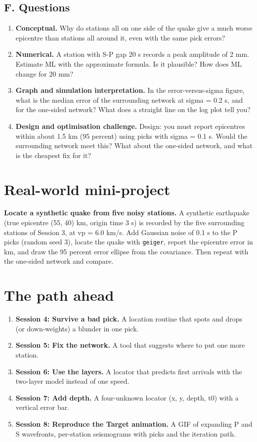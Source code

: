 \documentclass[11pt,a4paper]{article}
\begin{document}
\subsection*{F. Questions}
\begin{enumerate}[nosep]
\item \textbf{Conceptual.} Why do stations all on one side of the quake give a much worse epicentre than stations all around it, even with the same pick errors?
\item \textbf{Numerical.} A station with S-P gap 20 s records a peak amplitude of 2 mm. Estimate ML with the approximate formula. Is it plausible? How does ML change for 20 mm?
\item \textbf{Graph and simulation interpretation.} In the error-versus-sigma figure, what is the median error of the surrounding network at sigma = 0.2 s, and for the one-sided network? What does a straight line on the log plot tell you?
\item \textbf{Design and optimisation challenge.} Design: you must report epicentres within about 1.5 km (95 percent) using picks with sigma = 0.1 s. Would the surrounding network meet this? What about the one-sided network, and what is the cheapest fix for it?
\end{enumerate}

\section{Real-world mini-project}
\textbf{Locate a synthetic quake from five noisy stations.} A synthetic earthquake (true epicentre (55, 40) km, origin time 3 s) is recorded by the five surrounding stations of Session 3, at vp = 6.0 km/s. Add Gaussian noise of 0.1 s to the P picks (random seed 3), locate the quake with \texttt{geiger}, report the epicentre error in km, and draw the 95 percent error ellipse from the covariance. Then repeat with the one-sided network and compare.

\section{The path ahead}
\begin{enumerate}[nosep]
\item \textbf{Session 4: Survive a bad pick.} A location routine that spots and drops (or down-weights) a blunder in one pick.
\item \textbf{Session 5: Fix the network.} A tool that suggests where to put one more station.
\item \textbf{Session 6: Use the layers.} A locator that predicts first arrivals with the two-layer model instead of one speed.
\item \textbf{Session 7: Add depth.} A four-unknown locator (x, y, depth, t0) with a vertical error bar.
\item \textbf{Session 8: Reproduce the Target animation.} A GIF of expanding P and S wavefronts, per-station seismograms with picks and the iteration path.
\end{enumerate}
\end{document}
